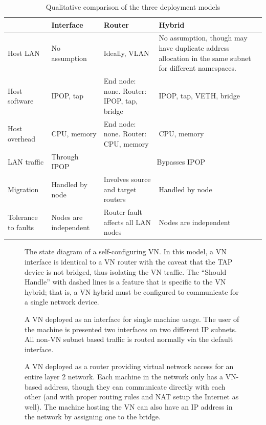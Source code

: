 \begin{table}[ht]
\centering
\begin{tabular}{|p{1in}||p{1.25in}|p{1.5in}|p{2.25in}|} \hline
 & Interface & Router & Hybrid \\ \hline\hline
Host LAN 
& 
No assumption 
& 
Ideally, VLAN
&
No assumption, though may have duplicate address allocation in the same subnet
for different namespaces.\footnotemark[2]
\\ \hline
Host software
&
IPOP, tap
&
End node: none. Router: IPOP, tap, bridge 
&
IPOP, tap, VETH, bridge \\ \hline
Host overhead
&
CPU, memory
& 
End node: none. Router: CPU, memory
&
CPU, memory \\ \hline
LAN traffic
&
Through IPOP
&
\multicolumn{2}{c|}{Bypasses IPOP} \\ \hline
Migration
&
Handled by node
&
Involves source and target routers
&
Handled by node \\ \hline
Tolerance to faults
&
Nodes are independent
&
Router fault affects all LAN nodes
&
Nodes are independent \\ \hline
\end{tabular}
\caption{Qualitative comparison of the three deployment models}
\label{tab:three_models}
\end{table}

\begin{figure}[ht]
\centering
{}
\caption[The state diagram of a self-configuring VN.]{The state diagram of a
self-configuring VN.  In this model, a VN interface is identical to a VN router
with the caveat that the TAP device is not bridged, thus isolating the VN
traffic.  The ``Should Handle'' with dashed lines is a feature that is specific
to the VN hybrid; that is, a VN hybrid must be configured to communicate for a
single network device.}
\label{fig:vn}
\end{figure}

\begin{figure}[ht]
\centering
{}
\caption[VN Interface]{A VN deployed as an interface for single machine usage.
The user of the machine is presented two interfaces on two different IP subnets.
All non-VN subnet based traffic is routed normally via the default interface.}
\label{fig:interface}
\end{figure}

\begin{figure}[ht]
\centering
{}
\caption[VN Router]{A VN deployed as a router providing virtual network access
for an entire layer 2 network.  Each machine in the network only has a VN-based
address, though they can communicate directly with each other (and with proper
routing rules and NAT setup the Internet as well).  The machine hosting the VN
can also have an IP address in the network by assigning one to the bridge.}
\label{fig:router}
\end{figure}

